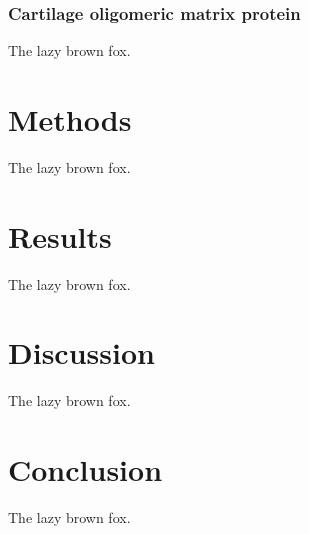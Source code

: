 \begin{refsection}
\subsubsection{Cartilage oligomeric matrix protein}
The lazy brown fox.

\section{Methods}
The lazy brown fox.

\section{Results}
The lazy brown fox.

\section{Discussion}
The lazy brown fox.

\section{Conclusion}
The lazy brown fox.

\printbibliography[heading=subbibliography]
\end{refsection}
